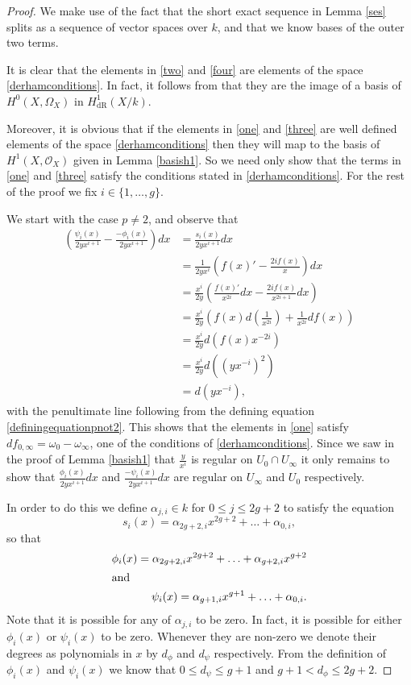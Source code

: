 \documentclass[11pt]{article} %
\theoremstyle{plain}
\theoremstyle{remark}
\newcommand{\hone}{H^1(X,\mathcal{O}_X)}
\newcommand{\derhamhone}{H_{\text {dR}}^1(X/k)}
\begin{document}
\begin{proof}
We make use of the fact that the short exact sequence in Lemma \ref{ses} splits as a sequence of vector spaces over $k$, and that we know bases of the outer two terms.

It is clear that the elements in \eqref{two} and \eqref{four} are elements of the space \eqref{derhamconditions}. 
In fact, it follows from \cite[Thm 6.1]{faithfulaction} that they are the image of a basis of $H^0(X,\Omega_X)$ in $\derhamhone$.

Moreover, it is obvious that if the elements in \eqref{one} and \eqref{three} are well defined elements of the space \eqref{derhamconditions} then they will map to the basis of $\hone$ given in Lemma \ref{basish1}.
So we need only show that the terms in \eqref{one} and \eqref{three} satisfy the conditions stated in \eqref{derhamconditions}.
For the rest of the proof we fix $i \in \{1, \ldots ,g\}$.


We start with the case $p\neq 2$, and observe that
\begin{align*}
\left(  \frac{\psi_i(x)}{2yx^{i+1}}  - \frac{-\phi_i(x)}{2yx^{i+1}} \right) dx & =  \frac{s_i(x)}{2yx^{i+1}} dx \\
& =  \frac{1}{2yx^i} \left( f(x)' - \frac{2if(x)}{x} \right) dx \\
& =  \frac{x^i}{2y} \left( \frac{f(x)'}{x^{2i}}dx -\frac{2if(x)}{x^{2i+1}} dx \right) \\
& =  \frac{x^i}{2y} \left( f(x)d\left(\frac{1}{x^{2i}}\right) + \frac{1}{x^{2i}}df(x) \right) \\
& =  \frac{x^i}{2y}d(f(x)x^{-2i}) \\
& =  \frac{x^i}{2y} d\left(\left(yx^{-i}\right)^2\right) \\
& =  d(yx^{-i}),
\end{align*}
with the penultimate line following from the defining equation \eqref{definingequationpnot2}.
This shows that the elements in \eqref{one} satisfy $df_{0, \infty} = \omega_0 - \omega_\infty$, one of the conditions of \eqref{derhamconditions}.
Since we saw in the proof of Lemma \ref{basish1} that $\frac{y}{x^i}$ is regular on $U_0\cap U_\infty$ it only remains to show that $\frac{\phi_i(x)}{2yx^{i+1}}dx$ and $\frac{-\psi_i(x)}{2yx^{i+1}}dx$ are regular on $U_\infty$ and $U_0$ respectively.


In order to do this we define $\alpha_{j,i} \in k$ for $0\leq j \leq 2g+2$ to satisfy the equation
\[
s_i(x) = \alpha_{2g+2,i}x^{2g+2} + \ldots + \alpha_{0,i},
\]
so that
\begin{align*}
\phi_i(x) = \alpha_{2g+2,i}x^{2g+2} + \ldots + \alpha_{g+2,i}x^{g+2} \\
\intertext{and }
\psi_i(x) = \alpha_{g+1,i}x^{g+1} + \ldots + \alpha_{0,i}.
\end{align*}
Note that it is possible for any of $\alpha_{j,i}$ to be zero. In fact, it is possible for either $\phi_i(x)$ or $\psi_i(x)$ to be zero.
Whenever they are non-zero we denote their degrees as polynomials in $x$ by $d_\phi$ and $d_\psi$ respectively. From the definition of $\phi_i(x)$ and $\psi_i(x)$ we know that $0 \leq d_\psi \leq g+1$ and $g+1 < d_\phi \leq 2g+2$.



\end{proof}
\end{document}
